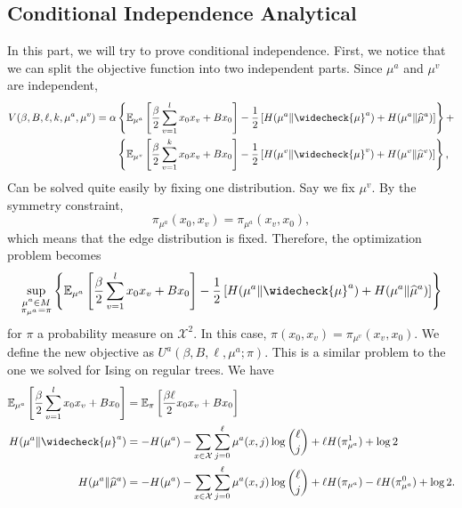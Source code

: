 \documentclass[12pt]{article}
\numberwithin{equation}{section}
\begin{document}
\newpage

\subsection{Conditional Independence Analytical}

In this part, we will try to prove conditional independence. First, we notice that we can split the objective function into two independent parts.
Since $\mu^a$ and $\mu^v$ are independent,
\begin{equation}
    \begin{aligned}
        V(\beta, B, \ell, k, \mu^a, \mu^v) = \alpha & \left\{\mathbb{E}_{\mu^a}\left[\frac\beta2\sum_{v=1}^l x_0x_v + B x_0\right]
        - \frac12\left[H(\mu^a\|\widecheck{\mu}^a)+H(\mu^a\|\widehat{\mu}^a)\right]\right\} +                                      \\
                                                    & \left\{\mathbb{E}_{\mu^v}\left[\frac\beta2\sum_{v=1}^k x_0x_v + B x_0\right]
        - \frac12\left[H(\mu^v\|\widecheck{\mu}^v)+H(\mu^v\|\widehat{\mu}^v)\right]\right\},
    \end{aligned}
\end{equation}
Can be solved quite easily by fixing one distribution.
Say we fix $\mu^v$. By the symmetry constraint,
\begin{equation*}
    \pi_{\mu^a}(x_0, x_v) = \pi_{\mu^a}(x_v, x_0),
\end{equation*}
which means that the edge distribution is fixed. Therefore, the optimization problem becomes
\begin{equation}
    \sup_{\substack{\mu^a\in M \\ \pi_{\mu^a}=\pi}} \left\{\mathbb{E}_{\mu^a}\left[\frac\beta2\sum_{v=1}^l x_0x_v + B x_0\right]
    - \frac12\left[H(\mu^a\|\widecheck{\mu}^a)+H(\mu^a\|\widehat{\mu}^a)\right]\right\}
\end{equation}
for $\pi$ a probability measure on $\mathcal{X}^2$. In this case, $\pi(x_0, x_v) = \pi_{\mu^v}(x_v, x_0)$. We define the new objective as $U^a(\beta, B, \ell, \mu^a; \pi)$.
This is a similar problem to the one we solved for Ising on regular trees. We have
\begin{align*}
    \mathbb{E}_{\mu^a}\left[\frac\beta2\sum_{v=1}^l x_0x_v + B x_0\right] & = \mathbb{E}_\pi\left[\frac{\beta\ell}{2}x_0 x_v+Bx_0\right]                                                                        \\
    H(\mu^a\|\widecheck{\mu}^a)                                           & = -H(\mu^a)-\sum_{x\in\mathcal{X}}\sum_{j=0}^\ell\mu^a(x, j)\log{\ell\choose j} +\ell H(\pi_{\mu^a}^1)  + \log2                     \\
    H(\mu^a\|\widehat{\mu}^a)                                             & = -H(\mu^a)-\sum_{x\in\mathcal{X}}\sum_{j=0}^\ell\mu^a(x, j)\log{\ell\choose j} +\ell H(\pi_{\mu^a})-\ell H(\pi_{\mu^a}^0) + \log2.
\end{align*}
\end{document}
